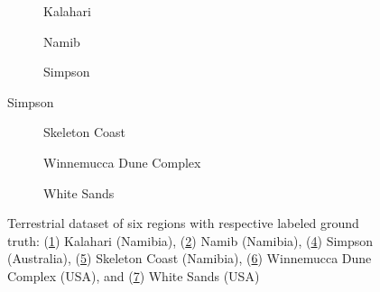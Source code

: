 \begin{figure}
	\centering
	\begin{subfigure}{\textwidth}
		\centering
		\caption{ Kalahari }
		\label{fig:kalahari_image}
	\end{subfigure}
	\begin{subfigure}{\textwidth}
		\centering
		\caption{ Namib }
		\label{fig:namib_image}
	\end{subfigure}
	\begin{subfigure}{\textwidth}
		\centering
		\caption{ Simpson}
		\label{fig:simpson_image}
	\end{subfigure}
\end{figure}
\begin{figure}
	\ContinuedFloat
	\centering
	\begin{subfigure}{\textwidth}
		\centering
		\caption{ Skeleton Coast}
		\label{fig:skeleton_coast_image}
	\end{subfigure}
	\begin{subfigure}{\textwidth}
		\centering
		\caption{ Winnemucca Dune Complex }
		\label{fig:wdc_image}
	\end{subfigure}
	\begin{subfigure}{\textwidth}
		\centering
		\caption{ White Sands }
		\label{fig:white_sands_image}
	\end{subfigure}
	\caption{Terrestrial dataset of six regions with respective labeled ground truth: (\ref{fig:kalahari_image}) Kalahari (Namibia), (\ref{fig:namib_image}) Namib (Namibia), (\ref{fig:simpson_image}) Simpson (Australia), (\ref{fig:skeleton_coast_image}) Skeleton Coast (Namibia), (\ref{fig:wdc_image}) Winnemucca Dune Complex (USA), and (\ref{fig:white_sands_image}) White Sands (USA)}
	\label{fig:terrestrial_dataset}
\end{figure}



